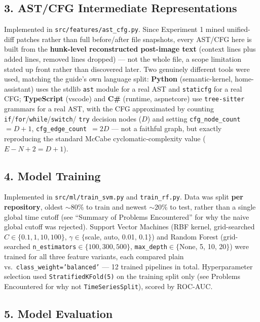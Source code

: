 \documentclass{experimentreport}
\begin{document}
{\begin{itemize}
\end{itemize}

\subsection*{3. AST/CFG Intermediate Representations}

Implemented in \texttt{src/features/ast\_cfg.py}. Since Experiment 1 mined unified-diff patches
rather than full before/after file snapshots, every
AST/CFG here is built from the \textbf{hunk-level reconstructed post-image text} (context lines
plus added lines, removed lines dropped) --- not the whole file, a scope limitation stated
up front rather than discovered later. Two genuinely different tools were used, matching the
guide's own language split: \textbf{Python} (semantic-kernel, home-assistant) uses the stdlib
\texttt{ast} module for a real AST and \texttt{staticfg} for a real CFG; \textbf{TypeScript}
(vscode) and \textbf{C\#} (runtime, aspnetcore) use \texttt{tree-sitter} grammars for a real AST,
with the CFG approximated by counting \texttt{if}/\allowbreak\texttt{for}/\allowbreak\texttt{while}/\allowbreak\texttt{switch}/
\texttt{try} decision nodes ($D$) and setting \texttt{cfg\_node\_count}~$=D+1$,
\texttt{cfg\_edge\_count}~$=2D$ --- not a faithful graph, but exactly reproducing the standard
McCabe cyclomatic-complexity value ($E-N+2=D+1$).

\subsection*{4. Model Training}

Implemented in \texttt{src/ml/train\_svm.py} and \texttt{train\_rf.py}. Data was split
\textbf{per repository}, oldest $\sim$80\% to train and newest $\sim$20\% to test,
rather than a single global time cutoff (see ``Summary of Problems Encountered'' for why the naive
global cutoff was rejected). Support Vector Machines (RBF kernel, grid-searched
$C\in\{0.1,1,10,100\}$, $\gamma\in\{$scale, auto, 0.01, 0.1$\}$) and Random Forest
(grid-searched \texttt{n\_estimators}$\in\{100,300,500\}$, \texttt{max\_depth}$\in\{$None, 5, 10,
20$\}$) were trained for all three feature variants, each compared plain vs.\
\texttt{class\_weight='balanced'} --- 12 trained pipelines in total. Hyperparameter selection used
\texttt{StratifiedKFold(5)} on the training split only (see Problems Encountered for why not
\texttt{TimeSeriesSplit}), scored by ROC-AUC.

\subsection*{5. Model Evaluation}

}
\end{document}
